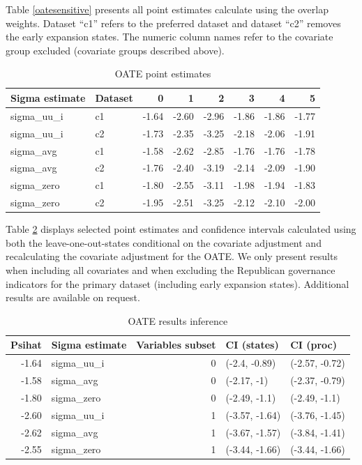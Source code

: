 \documentclass[12pt]{article}
\begin{document}
Table \ref{oatesensitive} presents all point estimates calculate using the overlap weights. Dataset ``c1'' refers to the preferred dataset and dataset ``c2'' removes the early expansion states. The numeric column names refer to the covariate group excluded (covariate groups described above).

\begin{table}[ht]
\begin{tabular}{llrrrrrr}
  \toprule
Sigma estimate & Dataset & 0 & 1 & 2 & 3 & 4 & 5 \\ 
  \midrule
sigma\_uu\_i & c1 & -1.64 & -2.60 & -2.96 & -1.86 & -1.86 & -1.77 \\ 
  sigma\_uu\_i & c2 & -1.73 & -2.35 & -3.25 & -2.18 & -2.06 & -1.91 \\ 
  sigma\_avg & c1 & -1.58 & -2.62 & -2.85 & -1.76 & -1.76 & -1.78 \\ 
  sigma\_avg & c2 & -1.76 & -2.40 & -3.19 & -2.14 & -2.09 & -1.90 \\ 
  sigma\_zero & c1 & -1.80 & -2.55 & -3.11 & -1.98 & -1.94 & -1.83 \\ 
  sigma\_zero & c2 & -1.95 & -2.51 & -3.25 & -2.12 & -2.10 & -2.00 \\ 
   \bottomrule
\end{tabular}
\caption{OATE point estimates}
\label{oateptests}
\end{table}

Table \ref{oateconfint} displays selected point estimates and confidence intervals calculated using both the leave-one-out-states conditional on the covariate adjustment and recalculating the covariate adjustment for the OATE. We only present results when including all covariates and when excluding the Republican governance indicators for the primary dataset (including early expansion states). Additional results are available on request.

\begin{table}[ht]
\begin{tabular}{rlrll}
  \toprule
Psihat & Sigma estimate & Variables subset & CI (states) & CI (proc) \\ 
  \midrule
-1.64 & sigma\_uu\_i & 0 & (-2.4, -0.89) & (-2.57, -0.72) \\ 
  -1.58 & sigma\_avg & 0 & (-2.17, -1) & (-2.37, -0.79) \\ 
  -1.80 & sigma\_zero & 0 & (-2.49, -1.1) & (-2.49, -1.1) \\ 
  -2.60 & sigma\_uu\_i & 1 & (-3.57, -1.64) & (-3.76, -1.45) \\ 
  -2.62 & sigma\_avg & 1 & (-3.67, -1.57) & (-3.84, -1.41) \\ 
  -2.55 & sigma\_zero & 1 & (-3.44, -1.66) & (-3.44, -1.66) \\ 
   \bottomrule
\end{tabular}
\caption{OATE results inference}
\label{oateconfint}
\end{table}
\end{document}

